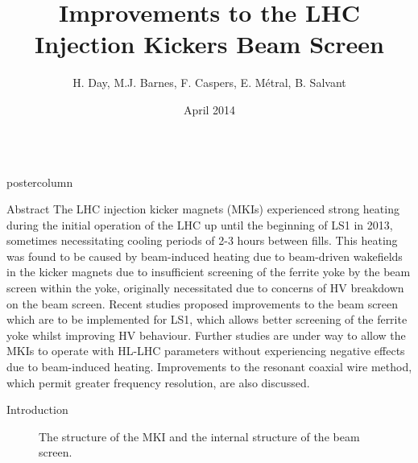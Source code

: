 \documentclass[final,hyperref={pdfpagelabels=false}]{beamer}
\title{Improvements to the LHC Injection Kickers Beam Screen}
\author{H. Day, M.J. Barnes, F. Caspers, E. Métral, B. Salvant}
\institute[CERN]{CERN, Geneva, Switzerland}
\date[April 2014]{April 2014}
\newlength{\columnheight}
\begin{document}
\begin{frame}
  \begin{columns}
    \begin{column}{.49\textwidth}
      \begin{beamercolorbox}[center,wd=\textwidth]{postercolumn}
        \begin{minipage}[T]{.95\textwidth}  %
          \parbox[t][\columnheight]{\textwidth}{ %
            \begin{block}{Abstract}
\small{
The LHC injection kicker magnets (MKIs) experienced strong heating during the initial operation of the LHC up until the beginning of LS1 in 2013, sometimes necessitating cooling periods of 2-3 hours between fills. This heating was found to be caused by beam-induced heating due to beam-driven wakefields in the kicker magnets due to insufficient screening of the ferrite yoke by the beam screen within the yoke, originally necessitated due to concerns of HV breakdown on the beam screen. Recent studies proposed improvements to the beam screen which are to be implemented for LS1, which allows better screening of the ferrite yoke whilst improving HV behaviour. Further studies are under way to allow the MKIs to operate with HL-LHC parameters without experiencing negative effects due to beam-induced heating. Improvements to the resonant coaxial wire method, which permit greater frequency resolution, are also discussed.
}
\end{block}
            \vfill

	\begin{block}{Introduction}
\small{
\begin{figure}
\caption{ The structure of the MKI and  the internal structure of the beam screen.}


\end{figure}}
\end{block}}
\end{minipage}
\end{beamercolorbox}
\end{column}
\end{columns}
\end{frame}
\end{document}
